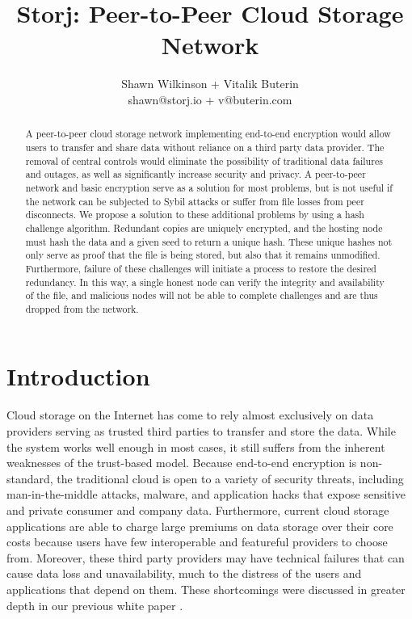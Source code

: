 \documentclass[a4paper,10pt]{article}
\begin{document}
\lstset{basicstyle=\ttfamily\footnotesize,breaklines=true}
\lstset{numbers=left, numberstyle=\tiny, stepnumber=1, numbersep=5pt}
\lstset{language=TeX}

\title{\large \bf Storj:  Peer-to-Peer Cloud Storage Network}
\author{\small Shawn Wilkinson + Vitalik Buterin\\ \small shawn@storj.io + v@buterin.com \\ }
\maketitle
\begin{abstract}
A peer-to-peer cloud storage network implementing end-to-end encryption would allow users to transfer and share data without reliance on a third party data provider. The removal of central controls would eliminate the possibility of traditional data failures and outages, as well as significantly increase security and privacy. A peer-to-peer network and basic encryption serve as a solution for most problems, but is not useful if the network can be subjected to Sybil attacks or suffer from file losses from peer disconnects. We propose a solution to these additional problems by using a hash challenge algorithm. Redundant copies are uniquely encrypted, and the hosting node must hash the data and a given seed to return a unique hash. These unique hashes not only serve as proof that the file is being stored, but also that it remains unmodified. Furthermore, failure of these challenges will initiate a process to restore the desired redundancy. In this way, a single honest node can verify the integrity and availability of the file, and malicious nodes will not be able to complete challenges and are thus dropped from the network. 
\end{abstract}

\section{Introduction}
Cloud storage on the Internet has come to rely almost exclusively on data providers serving as trusted third parties to transfer and store the data. While the system works well enough in most cases, it still suffers from the inherent weaknesses of the trust-based model. Because end-to-end encryption is non-standard, the traditional cloud is open to a variety of security threats, including man-in-the-middle attacks, malware, and application hacks that expose sensitive and private consumer and company data. Furthermore, current cloud storage applications are able to charge large premiums on data storage over their core costs because users have few interoperable and featureful providers to choose from. Moreover, these third party providers may have technical failures that can cause data loss and unavailability, much to the distress of the users and applications that depend on them. These shortcomings were discussed in greater depth in our previous white paper \cite{1}.\\
\end{document}
